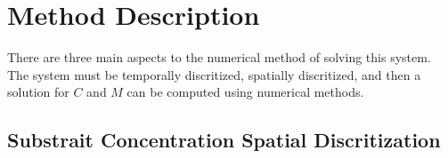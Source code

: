 

\section{Method Description}

  There are three main aspects to the numerical method of solving this system.
  The system must be temporally discritized, spatially discritized, and then a solution for $C$ and $M$ can be computed using numerical methods.
 

  \subsection{Substrait Concentration Spatial Discritization}

